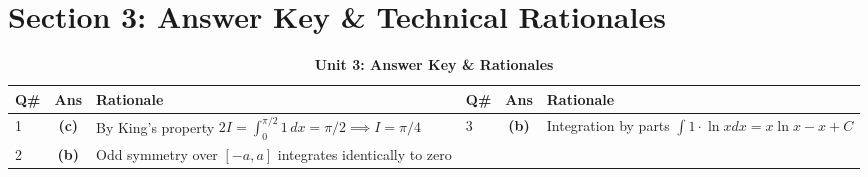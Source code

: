 \section{Section 3: Answer Key \& Technical Rationales}
\begin{table}[htbp]
\centering
\caption{\textbf{Unit 3: Answer Key \& Rationales}}
\vspace{2mm}
\begin{tabularx}{\textwidth}{l c X l c X}
\toprule
\textbf{Q\#} & \textbf{Ans} & \textbf{Rationale} & \textbf{Q\#} & \textbf{Ans} & \textbf{Rationale} \\
\midrule
1 & \textbf{(c)} & By King's property $2I = \int_0^{\pi/2} 1\,dx = \pi/2 \implies I = \pi/4$ & 3 & \textbf{(b)} & Integration by parts $\int 1 \cdot \ln x dx = x\ln x - x + C$ \\
2 & \textbf{(b)} & Odd symmetry over $[-a, a]$ integrates identically to zero & & & \\
\bottomrule
\end{tabularx}
\end{table}
